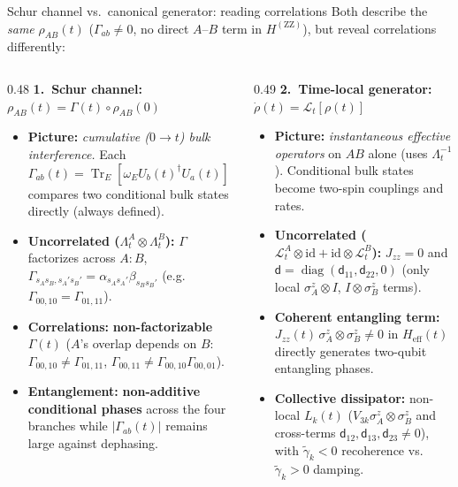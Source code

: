 \documentclass[aspectratio=169,11pt]{beamer}
\newcommand{\Tr}{\operatorname{Tr}}
\newcommand{\id}{\mathrm{id}}
\newcommand{\diag}{\operatorname{diag}}
\newcommand{\ZZ}{\mathrm{ZZ}}
\newcommand{\dmat}{\mathsf d}
\newcommand{\Heff}{H_{\mathrm{eff}}}
\begin{document}
\begin{frame}{Schur channel vs.\ canonical generator: reading correlations}
\footnotesize
Both describe the \emph{same} $\rho_{AB}(t)$ ($\Gamma_{ab}\neq0$, no direct $A$--$B$ term in $H^{(\ZZ)}$), but reveal correlations differently:
\smallskip
\begin{columns}[T,totalwidth=\textwidth]
\begin{column}{0.48\textwidth}
\textbf{1.\ Schur channel: $\rho_{AB}(t)=\Gamma(t)\circ\rho_{AB}(0)$}
\begin{itemize}\scriptsize\setlength\itemsep{3pt}
\item \textbf{Picture:} \emph{cumulative ($0\to t$) bulk interference.} Each $\Gamma_{ab}(t)=\Tr_E[\omega_E U_b(t)^\dagger U_a(t)]$ compares two conditional bulk states directly (always defined).
\item \textbf{Uncorrelated ($\Lambda_t^A\otimes\Lambda_t^B$):} $\Gamma$ factorizes across $A:B$, $\Gamma_{s_As_B,s_A's_B'}=\alpha_{s_As_A'}\beta_{s_Bs_B'}$ (e.g.\ $\Gamma_{00,10}=\Gamma_{01,11}$).
\item \textbf{Correlations:} \textbf{non-factorizable $\Gamma(t)$} ($A$'s overlap depends on $B$: $\Gamma_{00,10}\neq\Gamma_{01,11}$, $\Gamma_{00,11}\neq\Gamma_{00,10}\Gamma_{00,01}$).
\item \textbf{Entanglement:} \textbf{non-additive conditional phases} across the four branches while $\lvert\Gamma_{ab}(t)\rvert$ remains large against dephasing.
\end{itemize}
\end{column}
\begin{column}{0.49\textwidth}
\textbf{2.\ Time-local generator: $\dot\rho(t)=\mathcal L_t[\rho(t)]$}
\begin{itemize}\scriptsize\setlength\itemsep{3pt}
\item \textbf{Picture:} \emph{instantaneous effective operators} on $AB$ alone (uses $\Lambda_t^{-1}$). Conditional bulk states become two-spin couplings and rates.
\item \textbf{Uncorrelated ($\mathcal L_t^A\otimes\id+\id\otimes\mathcal L_t^B$):} $J_{zz}=0$ and $\dmat=\diag(\dmat_{11},\dmat_{22},0)$ (only local $\sigma_A^z\otimes I$, $I\otimes\sigma_B^z$ terms).
\item \textbf{Coherent entangling term:} $J_{zz}(t)\,\sigma_A^z\otimes\sigma_B^z\neq0$ in $\Heff(t)$ directly generates two-qubit entangling phases.
\item \textbf{Collective dissipator:} non-local $L_k(t)$ ($V_{3k}\sigma_A^z\otimes\sigma_B^z$ and cross-terms $\dmat_{12},\dmat_{13},\dmat_{23}\neq0$), with $\tilde\gamma_k<0$ recoherence vs.\ $\tilde\gamma_k>0$ damping.

\end{itemize}
\end{column}
\end{columns}
\end{frame}
\end{document}

